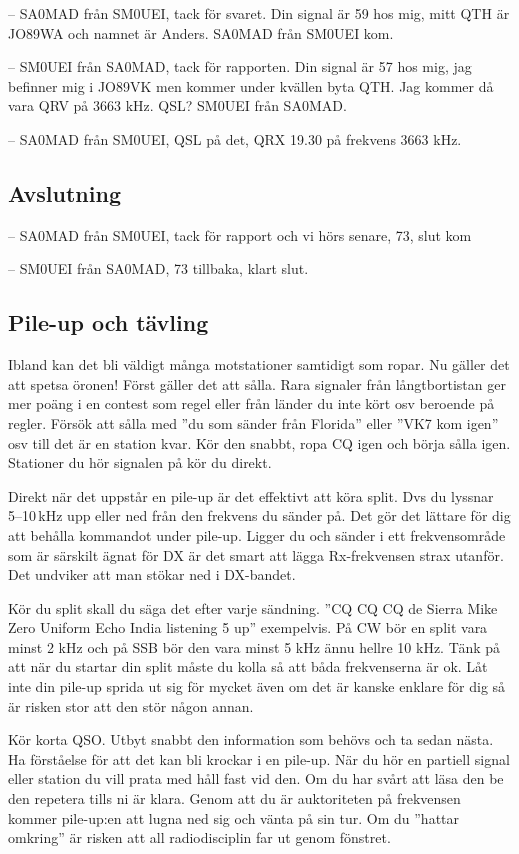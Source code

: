 -- SA0MAD från SM0UEI, tack för svaret. Din signal är 59 hos mig, mitt QTH är
JO89WA och namnet är Anders. SA0MAD från SM0UEI kom.

-- SM0UEI från SA0MAD, tack för rapporten. Din signal är 57 hos mig, jag
befinner mig i JO89VK men kommer under kvällen byta QTH. Jag kommer då vara QRV
på 3663 kHz. QSL? SM0UEI från SA0MAD.

-- SA0MAD från SM0UEI, QSL på det, QRX 19.30 på frekvens 3663 kHz.

\subsection{Avslutning}

-- SA0MAD från SM0UEI, tack för rapport och vi hörs senare, 73, slut kom

-- SM0UEI från SA0MAD, 73 tillbaka, klart slut.

\subsection{Pile-up och tävling}

Ibland kan det bli väldigt många motstationer samtidigt som ropar. Nu
gäller det att spetsa öronen! Först gäller det att sålla. Rara
signaler från långtbortistan ger mer poäng i en contest som regel
eller från länder du inte kört osv beroende på regler. Försök att
sålla med ''du som sänder från Florida'' eller ''VK7 kom igen'' osv
till det är en station kvar. Kör den snabbt, ropa CQ igen och börja
sålla igen. Stationer du hör signalen på kör du direkt.

Direkt när det uppstår en pile-up är det effektivt att köra split. Dvs
du lyssnar 5--10\,kHz upp eller ned från den frekvens du sänder
på. Det gör det lättare för dig att behålla kommandot under
pile-up. Ligger du och sänder i ett frekvensområde som är särskilt
ägnat för DX är det smart att lägga Rx-frekvensen strax utanför. Det
undviker att man stökar ned i DX-bandet.

Kör du split skall du säga det efter varje sändning. ''CQ CQ CQ de Sierra Mike
Zero Uniform Echo India listening 5 up'' exempelvis. På CW bör en split vara
minst 2 kHz och på SSB bör den vara minst 5 kHz ännu hellre 10 kHz. Tänk på att
när du startar din split måste du kolla så att båda frekvenserna är ok. Låt inte
din pile-up sprida ut sig för mycket även om det är kanske enklare för dig så är
risken stor att den stör någon annan.

Kör korta QSO. Utbyt snabbt den information som behövs och ta sedan nästa. Ha
förståelse för att det kan bli krockar i en pile-up. När du hör en partiell
signal eller station du vill prata med håll fast vid den. Om du har svårt att
läsa den be den repetera tills ni är klara. Genom att du är auktoriteten på
frekvensen kommer pile-up:en att lugna ned sig och vänta på sin tur. Om du
''hattar omkring'' är risken att all radiodisciplin far ut genom fönstret.


